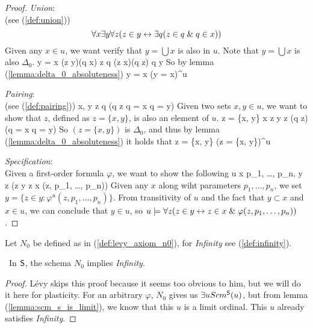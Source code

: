 \begin{proof}
\item \emph{Union}:\\
(see (\ref{def:union}))
\begin{equation}
\forall x \exists y \forall z (z \in y \leftrightarrow \exists q( z \in q \mathrel{\&} q \in x))
\end{equation}
Given any $x \in u$, we want verify that $y = \bigcup x$ is also in $u$. Note that $y = \bigcup x$ is also $\Delta_0$.
\beq
y = \bigcup x \iff (\forall z \in y)(\exists q \in x) z \in q \et (\forall z \in x)(\forall q \in z) q \in y
\eeq
So by lemma (\ref{lemma:delta_0_absoluteness})
\beq
y = \bigcup x \iff (y = \bigcup x)^u
\eeq

\item \emph{Pairing}:\\
(see (\ref{def:pairing}))
\beq
\forall x, y \exists z \forall q (q \in z \iff q = x \lor q = y)
\eeq
Given two sets $x, y \in u$, we want to show that $z$, defined as $z = \{x, y\}$, is also an element of $u$.
\beq
z = \{x, y\} \iff x \in z \et y \in z \et (\forall q \in z)(q = x \lor q = y)
\eeq
So $(z = \{x, y\})$ is $ \Delta_0 $, and thus by lemma (\ref{lemma:delta_0_absoluteness}) it holds that
\beq
z = \{x, y\} \iff (z = \{x, y\})^u
\eeq

\item \emph{Specification}: \\ %
Given a first-order formula $\varphi$, we want to show the following
\beq
u \models \forall x \forall p_1, \ldots, p_n, \exists y \forall z (z \in y \iff z \in x \et \varphi(z, p_1, \ldots, p_n))
\eeq
Given any $x$ along wiht parameters $p_1, \ldots, p_n$, we set $y = \{z \in y : \varphi^u(z, p_1, \ldots, p_n) \}$. From transitivity of $u$ and the fact that $y \subset x$ and $x \in u$, we can conclude that $y \in u$, so $u \models \forall z (z \in y \leftrightarrow z \in x \mathrel{\&} \varphi(z, p_1, \dots, p_n))$.
\ece
\end{proof}

Let $N_0$ be defined as in (\ref{def:levy_axiom_n0}), for \emph{Infinity} see (\ref{def:infinity}).
\begin{theorem}\
In $\sf{S}$, the schema $N_0$ implies \emph{Infinity}.
\end{theorem}

\begin{proof}
Lévy skips this proof because it seems too obvious to him, but we will do it here for plasticity.
For an arbitrary $\varphi$, $N_0$ gives us $\exists u Scm^{\sf{S}}(u)$, but from lemma (\ref{lemma:scm_s_is_limit}), we know that this $u$ is a limit ordinal. This $u$ already satisfies \emph{Infinity}.
\end{proof}
\

